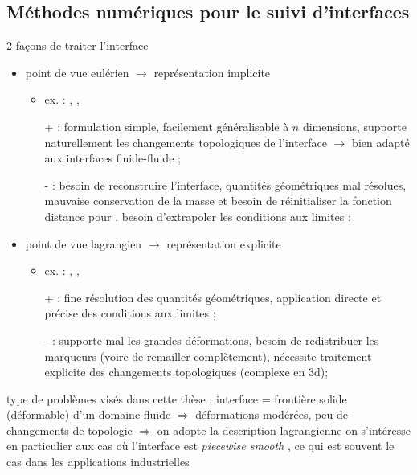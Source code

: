 \subsection*{Méthodes numériques pour le suivi d'interfaces}
2 façons de traiter l'interface
\begin{itemize}
	\item point de vue eulérien $\to$ représentation implicite
	\begin{itemize}
		\item ex. :  \cite{sethian1999},  \cite{gueyffier1999}, \etc
		\item[+] : formulation simple, facilement généralisable à $n$ dimensions, supporte naturellement les changements topologiques de l'interface $\to$ bien adapté aux interfaces fluide-fluide ;
		\item[-] : besoin de reconstruire l'interface, quantités géométriques mal résolues, mauvaise conservation de la masse et besoin de réinitialiser la fonction distance pour , besoin d'extrapoler les conditions aux limites ;
	\end{itemize}
	
	\item point de vue lagrangien $\to$ représentation explicite
	\begin{itemize}
		\item ex. :  \cite{popinet1999, tryggvason2001},  \cite{jiao2007}, \etc
		\item[+] : fine résolution des quantités géométriques, application directe et précise des conditions aux limites ;
		\item[-] : supporte mal les grandes déformations, besoin de redistribuer les marqueurs (voire de remailler complètement), nécessite traitement explicite des changements topologiques (complexe en 3d);
	\end{itemize}
\end{itemize}

\bigskip
type de problèmes visés dans cette thèse : interface = frontière solide (déformable) d'un domaine fluide $\Rightarrow$ déformations modérées, peu de changements de topologie $\Rightarrow$ on adopte la description lagrangienne
on s'intéresse en particulier aux cas où l'interface est \emph{piecewise smooth}%
, ce qui est souvent le cas dans les applications industrielles\\

